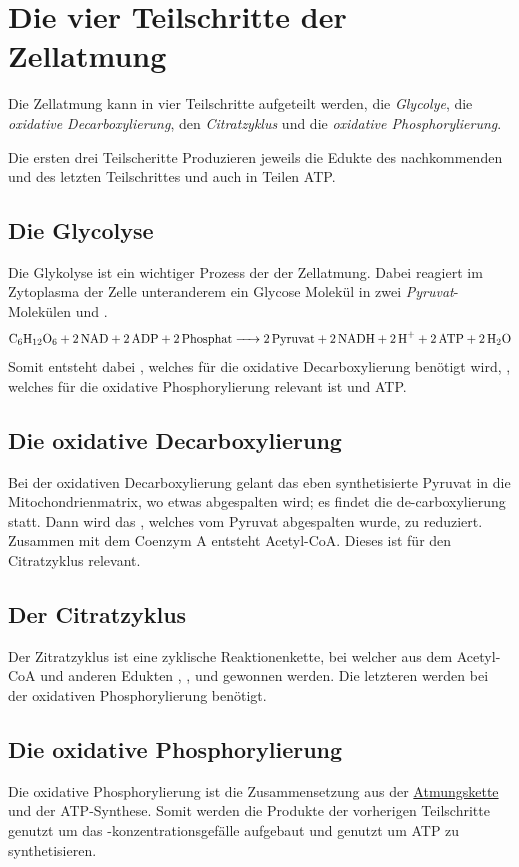 \documentclass{article}
\begin{document}
\section{Die vier Teilschritte der Zellatmung}
Die Zellatmung kann in vier Teilschritte aufgeteilt werden, die \emph{Glycolye}, die \emph{oxidative Decarboxylierung}, den \emph{Citratzyklus} und die \emph{oxidative Phosphorylierung}.
 
Die ersten drei Teilscheritte Produzieren jeweils die Edukte des nachkommenden und des letzten Teilschrittes und auch in Teilen ATP.
 
\subsection{Die Glycolyse} 
Die Glykolyse ist ein wichtiger Prozess der der Zellatmung. Dabei reagiert im Zytoplasma der Zelle unteranderem ein Glycose Molekül in zwei \emph{Pyruvat}-Molekülen und .
\[
 \ce{C6H12O6 + 2NAD + 2ADP + 2Phosphat -> 2 Pyruvat + 2NADH + 2H+ + 2 ATP + 2H2O} 
\]
Somit entsteht dabei , welches für die oxidative Decarboxylierung benötigt wird, , welches für die oxidative Phosphorylierung relevant ist und ATP.
 
\subsection{Die oxidative Decarboxylierung}
Bei der oxidativen Decarboxylierung gelant das eben synthetisierte Pyruvat in die Mitochondrienmatrix, wo etwas  abgespalten wird; es findet die de-carboxylierung statt. Dann wird das , welches vom Pyruvat abgespalten wurde, zu  reduziert. Zusammen mit dem Coenzym A entsteht Acetyl-CoA. Dieses ist für den Citratzyklus relevant.
 
\subsection{Der Citratzyklus}
Der Zitratzyklus ist eine zyklische Reaktionenkette, bei welcher aus dem Acetyl-CoA und anderen Edukten , ,  und  gewonnen werden. Die letzteren werden bei der oxidativen Phosphorylierung benötigt.
 
\subsection{Die oxidative Phosphorylierung} 
Die oxidative Phosphorylierung ist die Zusammensetzung aus der \hyperref[Die Atmungskette]{Atmungskette} und der ATP-Synthese. Somit werden die Produkte der vorherigen Teilschritte genutzt um das -konzentrationsgefälle aufgebaut und genutzt um ATP zu synthetisieren. 
\end{document}
